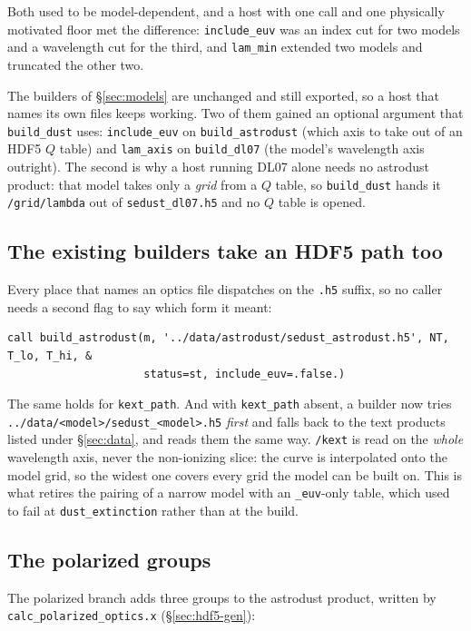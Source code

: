 \documentclass{my_memo}
\newcommand{\code}[1]{\texttt{#1}}
\begin{document}
Both used to be model-dependent, and a host with one call and one physically
motivated floor met the difference: \code{include\_euv} was an index cut for two
models and a wavelength cut for the third, and \code{lam\_min} extended two
models and truncated the other two.

The builders of \S\ref{sec:models} are unchanged and still exported, so a
host that names its own files keeps working. Two of them gained an optional
argument that \code{build\_dust} uses: \code{include\_euv} on
\code{build\_astrodust} (which axis to take out of an HDF5 $Q$ table) and
\code{lam\_axis} on \code{build\_dl07} (the model's wavelength axis outright).
The second is why a host running DL07 alone needs no astrodust product: that
model takes only a \emph{grid} from a $Q$ table, so \code{build\_dust} hands it
\code{/grid/lambda} out of \code{sedust\_dl07.h5} and no $Q$ table is opened.

\subsection{The existing builders take an HDF5 path too}

Every place that names an optics file dispatches on the \code{.h5} suffix, so no
caller needs a second flag to say which form it meant:

\begin{lstlisting}
call build_astrodust(m, '../data/astrodust/sedust_astrodust.h5', NT, T_lo, T_hi, &
                     status=st, include_euv=.false.)
\end{lstlisting}

\noindent The same holds for \code{kext\_path}. And with \code{kext\_path}
absent, a builder now tries \code{../data/<model>/sedust\_<model>.h5} \emph{first} and
falls back to the text products listed under \S\ref{sec:data}, and reads them
the same way. \code{/kext} is read on
the \emph{whole} wavelength axis, never the non-ionizing slice: the curve is
interpolated onto the model grid, so the widest one covers every grid the model
can be built on. This is what retires the pairing of a narrow model with an
\code{\_euv}-only table, which used to fail at \code{dust\_extinction} rather
than at the build.

\subsection{The polarized groups}\label{sec:hdf5-pol}

The polarized branch adds three groups to the astrodust product, written by
\code{calc\_polarized\_optics.x} (\S\ref{sec:hdf5-gen}):
\end{document}
